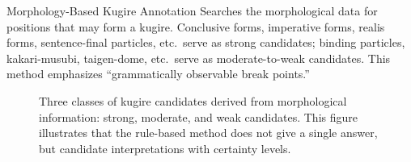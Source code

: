 \begin{block}{Morphology-Based Kugire Annotation}
Searches the morphological data for positions that may form a kugire. Conclusive
forms, imperative forms, realis forms, sentence-final particles, etc.\ serve as
strong candidates; binding particles, kakari-musubi, taigen-dome, etc.\ serve as
moderate-to-weak candidates. This method emphasizes ``grammatically observable
break points.''

\vspace{1.0ex}

\begin{figure}[H]\centering

\setcounter{figure}{6}
\caption{Three classes of kugire candidates derived from morphological information:
strong, moderate, and weak candidates. This figure illustrates that the rule-based
method does not give a single answer, but candidate interpretations with certainty
levels.}
\end{figure}
\end{block}
